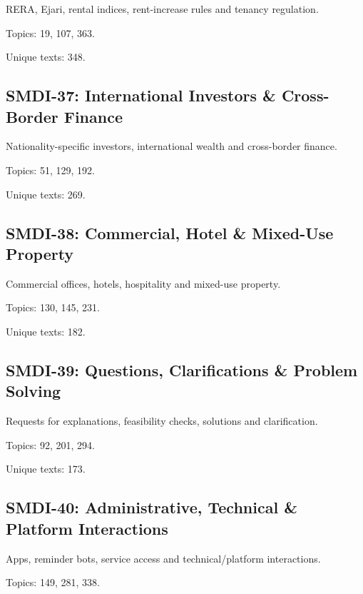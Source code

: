 \documentclass[10pt]{article}
\begin{document}
RERA, Ejari, rental indices, rent-increase rules and tenancy regulation.

\par Topics: 19, 107, 363.

\par Unique texts: 348.

\subsection*{SMDI-37: International Investors \& Cross-Border Finance}

Nationality-specific investors, international wealth and cross-border finance.

\par Topics: 51, 129, 192.

\par Unique texts: 269.

\subsection*{SMDI-38: Commercial, Hotel \& Mixed-Use Property}

Commercial offices, hotels, hospitality and mixed-use property.

\par Topics: 130, 145, 231.

\par Unique texts: 182.

\subsection*{SMDI-39: Questions, Clarifications \& Problem Solving}

Requests for explanations, feasibility checks, solutions and clarification.

\par Topics: 92, 201, 294.

\par Unique texts: 173.

\subsection*{SMDI-40: Administrative, Technical \& Platform Interactions}

Apps, reminder bots, service access and technical/platform interactions.

\par Topics: 149, 281, 338.
\end{document}
